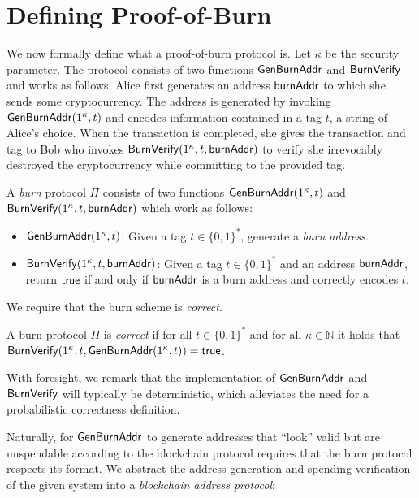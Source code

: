 \section{Defining Proof-of-Burn}

We now formally define what a proof-of-burn protocol is. Let $\kappa$ be the security parameter. The protocol consists of two functions $\mathsf{Gen}\-\mathsf{Burn}\-\mathsf{Addr}$ and $\mathsf{BurnVerify}$ and works as follows. Alice first generates an address $\mathsf{burnAddr}$ to which she sends some cryptocurrency. The address is generated by invoking $\mathsf{Gen}\-\mathsf{Burn}\-\mathsf{Addr}(1^\kappa, t)$ and encodes information contained in a tag $t$, a string of Alice's choice. When the transaction is completed, she gives the transaction and tag to Bob who invokes $\mathsf{BurnVerify}(1^\kappa, t, \mathsf{burnAddr})$ to verify she irrevocably destroyed the cryptocurrency while committing to the provided tag.

\begin{definition}
  A \emph{burn} protocol $\Pi$ consists of two functions $\mathsf{Gen}\-\mathsf{Burn}\-\mathsf{Addr}(1^\kappa, t)$ and $\mathsf{BurnVerify}(1^\kappa, t, \mathsf{burnAddr})$ which work as follows:

  \begin{itemize}
    \item $\mathsf{Gen}\-\mathsf{Burn}\-\mathsf{Addr}(1^\kappa, t)$: Given a tag $t \in \{0,1\}^*$, generate a \emph{burn address}.

    \item $\mathsf{BurnVerify}(1^\kappa, t, \mathsf{burnAddr})$: Given a tag $t \in \{0,1\}^*$ and an address $\mathsf{burnAddr}$, return $\sf{true}$ if and only if $\mathsf{burnAddr}$ is a burn address and correctly encodes $t$.
  \end{itemize}
\end{definition}

We require that the burn scheme is \emph{correct}.

\begin{definition}[Correctness]
  A burn protocol $\Pi$ is \emph{correct} if for all $t \in \{0,1\}^*$ and for all $\kappa \in \mathbb{N}$ it holds that
  $\mathsf{BurnVerify}(1^\kappa, t, \mathsf{Gen}\-\mathsf{Burn}\-\mathsf{Addr}(1^\kappa, t)) = \mathsf{true}$.
\end{definition}

With foresight, we remark that the implementation of $\mathsf{Gen}\-\mathsf{Burn}\-\mathsf{Addr}$ and $\mathsf{BurnVerify}$ will typically be deterministic, which alleviates the need for a probabilistic correctness definition.

Naturally, for $\mathsf{Gen}\-\mathsf{Burn}\-\mathsf{Addr}$ to generate addresses that ``look'' valid but are unspendable according to the blockchain protocol requires that the burn protocol respects its format. We abstract the address generation and spending verification of the given system into a \emph{blockchain address protocol}:

